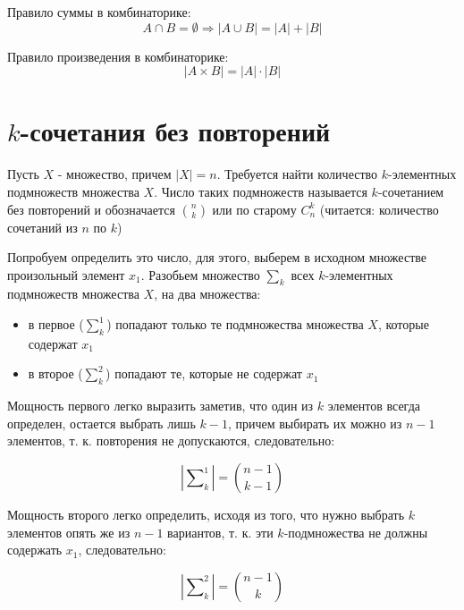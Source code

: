 \begin{Def}
	Правило суммы в комбинаторике:
	\[
		A \cap B = \emptyset \Rightarrow \left| A \cup B \right| = \left| A \right| + \left| B \right|
	\]
\end{Def}

\begin{Def}
	Правило произведения в комбинаторике:
	\[
		\left| A \times B \right| = \left| A \right| \cdot \left| B \right|
	\]
\end{Def}

\section{$k$-сочетания без повторений}

Пусть $X$ - множество, причем $\left| X \right| = n$. Требуется найти количество $k$-элементных подмножеств множества $X$. Число таких подмножеств называется $k$-сочетанием без повторений и обозначается $\binom{n}{k}$ или по старому $C_n^k$ (читается: количество сочетаний из $n$ по $k$)

Попробуем определить это число, для этого, выберем в исходном множестве произольный элемент $x_1$. Разобьем множество $\sum_k$ всех $k$-элементных подмножеств множества $X$, на два множества:

\begin{itemize}
\item в первое ($\sum_k^1$) попадают только те подмножества множества $X$, которые содержат $x_1$

\item в второе ($\sum_k^2$) попадают те, которые не содержат $x_1$
\end{itemize}

Мощность первого легко выразить заметив, что один из $k$ элементов всегда определен, остается выбрать лишь $k-1$, причем выбирать их можно из $n-1$ элементов, т. к. повторения не допускаются, следовательно:

\begin{equation}
	\left| \sum\nolimits_k^1 \right| = \binom{n-1}{k-1}
\end{equation}

Мощность второго легко определить, исходя из того, что нужно выбрать $k$ элементов опять же из $n-1$ вариантов, т. к. эти $k$-подмножества не должны содержать $x_1$, следовательно:

\begin{equation}
	\left| \sum\nolimits_k^2 \right| = \binom{n-1}{k}
\end{equation}

